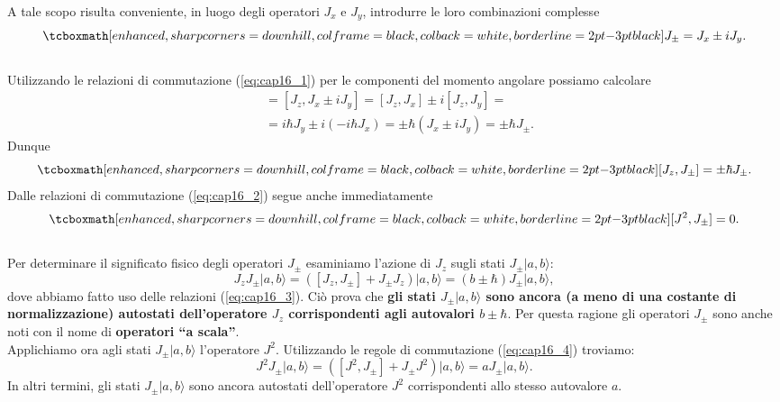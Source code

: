 A tale scopo risulta conveniente, in luogo degli operatori $J_x$ e $J_y$, introdurre le loro combinazioni complesse
	\begin{equation}
		\tcboxmath[enhanced, sharp corners=downhill, colframe=black, colback=white, borderline={2pt}{-3pt}{black}]{
			J_{\pm} = J_x \pm i J_y .
			}
	\end{equation}\\
Utilizzando le relazioni di commutazione (\ref{eq:cap16_1}) per le componenti del momento angolare possiamo calcolare
	\begin{align}
		[J_z , J_{\pm}] & =  [J_z , J_x \pm i J_y] = [J_z , J_x] \pm i [J_z ,J_y] = \nonumber \\
		& = i\hbar J_y \pm i (-i\hbar J_x) = \pm \hbar (J_x \pm i J_y ) = \pm \hbar J_{\pm} .
	\end{align}
Dunque
	\begin{equation}
		\tcboxmath[enhanced, sharp corners=downhill, colframe=black, colback=white, borderline={2pt}{-3pt}{black}]{
			[J_z , J_{\pm}] = \pm \hbar J_{\pm} .
			}
	\label{eq:cap16_3}
	\end{equation}
Dalle relazioni di commutazione (\ref{eq:cap16_2}) segue anche immediatamente
	\begin{equation}
		\tcboxmath[enhanced, sharp corners=downhill, colframe=black, colback=white, borderline={2pt}{-3pt}{black}]{
			[J^2 , J_{\pm}]=0 .
			}
	\label{eq:cap16_4}
	\end{equation}\\
	
Per determinare il significato fisico degli operatori $J_{\pm}$ esaminiamo l'azione di $J_z$ sugli stati $J_{\pm} \vert a, b \rangle$:
\begin{equation}
J_zJ_{\pm} \vert a, b \rangle =\left( [J_z,J_{\pm}] + J_{\pm}J_{z}\right)\vert a, b \rangle = (b \pm \hbar )J_{\pm} \vert a, b \rangle , 
\end{equation}
dove abbiamo fatto uso delle relazioni (\ref{eq:cap16_3}). Ciò prova che \textbf{gli stati $ J_{\pm} \vert a, b \rangle$ sono ancora (a meno di una costante di normalizzazione) autostati dell'operatore $J_z$ corrispondenti agli autovalori $b\pm \hbar$}. Per questa ragione gli operatori $J_{\pm}$ sono anche noti con il nome di \textbf{operatori ``a scala''}.\\

Applichiamo ora agli stati $ J_{\pm} \vert a, b \rangle$ l'operatore $J^2$. Utilizzando le regole di commutazione (\ref{eq:cap16_4}) troviamo:
	\begin{equation}
		J^2J_{\pm} \vert a, b \rangle = \left( [J^2,J_{\pm}] + J_{\pm}J^2\right)\vert a, b \rangle = a J_{\pm} \vert a, b \rangle .
	\end{equation}
In altri termini, gli stati $J_{\pm} \vert a, b \rangle$ sono ancora autostati dell'operatore $J^2$ corrispondenti allo stesso autovalore $a$.\\

